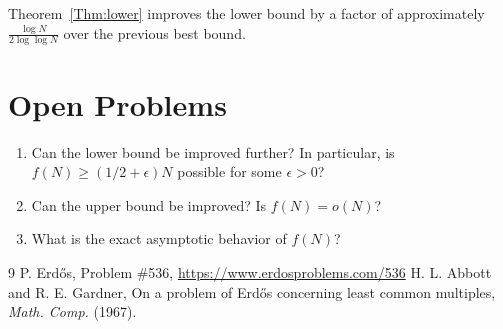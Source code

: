 \documentclass[11pt]{article}
\begin{document}
Theorem~\ref{Thm:lower} improves the lower bound by a factor of approximately $\frac{\log N}{2\log\log N}$ over the previous best bound.

\section{Open Problems}

\begin{enumerate}
    \item Can the lower bound be improved further? In particular, is $f(N) \geq (1/2 + \epsilon)N$ possible for some $\epsilon > 0$?
    \item Can the upper bound be improved? Is $f(N) = o(N)$?
    \item What is the exact asymptotic behavior of $f(N)$?
\end{enumerate}

\begin{thebibliography}{9}
 P. Erd\H{o}s, Problem \#536, \url{https://www.erdosproblems.com/536}
 H. L. Abbott and R. E. Gardner, On a problem of Erd\H{o}s concerning least common multiples, \emph{Math. Comp.} (1967).
\end{thebibliography}
\end{document}
